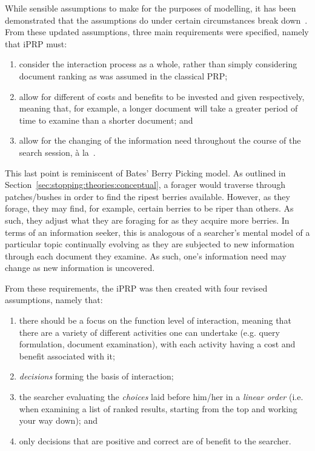 While sensible assumptions to make for the purposes of modelling, it has been demonstrated that the assumptions do under certain circumstances break down~\citep{gordon1991utility_theory}. From these updated assumptions, three main requirements were specified, namely that iPRP must:

\begin{enumerate}
    \item{consider the interaction process as a whole, rather than simply considering document ranking as was assumed in the classical PRP;}
    \item{allow for different of costs and benefits to be invested and given respectively, meaning that, for example, a longer document will take a greater period of time to examine than a shorter document; and}
    \item{allow for the changing of the information need throughout the course of the search session, \`{a} la~\cite{belkin1980ask}.}
\end{enumerate}

This last point is reminiscent of Bates' Berry Picking model. As outlined in Section~\ref{sec:stopping:theories:conceptual}, a forager would traverse through patches/bushes in order to find the ripest berries available. However, as they forage, they may find, for example, certain berries to be riper than others. As such, they adjust what they are foraging for as they acquire more berries. In terms of an information seeker, this is analogous of a searcher's mental model of a particular topic continually evolving as they are subjected to new information through each document they examine. As such, one's information need may change as new information is uncovered.

From these requirements, the iPRP was then created with four revised assumptions, namely that:

\begin{enumerate}
    \item{there should be a focus on the function level of interaction, meaning that there are a variety of different activities one can undertake (e.g. query formulation, document examination), with each activity having a cost and benefit associated with it;}
    \item{\emph{decisions} forming the basis of interaction;}
    \item{the searcher evaluating the \emph{choices} laid before him/her in a \emph{linear order} (i.e. when examining a list of ranked results, starting from the top and working your way down); and}
    \item{only decisions that are positive and correct are of benefit to the searcher.}
\end{enumerate}

